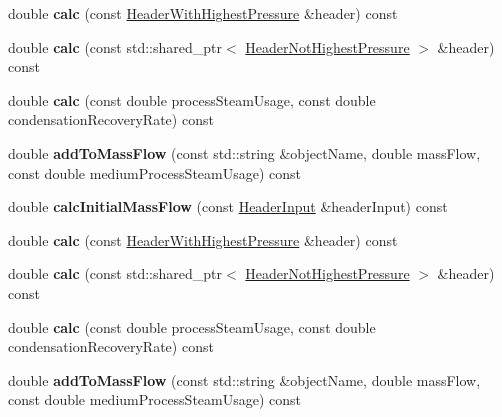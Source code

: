 \begin{DoxyCompactItemize}
\mbox{\label{class_mass_flow_calculator_a7213009c1ffc498b7dbac1d429cd6a93}} 
double {\bfseries calc} (const \hyperlink{class_header_with_highest_pressure}{Header\+With\+Highest\+Pressure} \&header) const
\item 
\mbox{\label{class_mass_flow_calculator_a2a3012c8c1d2ed53cdb38cd4a20b622d}} 
double {\bfseries calc} (const std\+::shared\+\_\+ptr$<$ \hyperlink{class_header_not_highest_pressure}{Header\+Not\+Highest\+Pressure} $>$ \&header) const
\item 
\mbox{\label{class_mass_flow_calculator_a5130b0192b5f041d1abe2f6094196849}} 
double {\bfseries calc} (const double process\+Steam\+Usage, const double condensation\+Recovery\+Rate) const
\item 
\mbox{\label{class_mass_flow_calculator_a53d5e454ecd9c62bbe2c201528797ec4}} 
double {\bfseries add\+To\+Mass\+Flow} (const std\+::string \&object\+Name, double mass\+Flow, const double medium\+Process\+Steam\+Usage) const
\item 
\mbox{\label{class_mass_flow_calculator_adb4bbfd8c503a653bf1950d5697574a4}} 
double {\bfseries calc\+Initial\+Mass\+Flow} (const \hyperlink{class_header_input}{Header\+Input} \&header\+Input) const
\item 
\mbox{\label{class_mass_flow_calculator_a7213009c1ffc498b7dbac1d429cd6a93}} 
double {\bfseries calc} (const \hyperlink{class_header_with_highest_pressure}{Header\+With\+Highest\+Pressure} \&header) const
\item 
\mbox{\label{class_mass_flow_calculator_a2a3012c8c1d2ed53cdb38cd4a20b622d}} 
double {\bfseries calc} (const std\+::shared\+\_\+ptr$<$ \hyperlink{class_header_not_highest_pressure}{Header\+Not\+Highest\+Pressure} $>$ \&header) const
\item 
\mbox{\label{class_mass_flow_calculator_a5130b0192b5f041d1abe2f6094196849}} 
double {\bfseries calc} (const double process\+Steam\+Usage, const double condensation\+Recovery\+Rate) const
\item 
\mbox{\label{class_mass_flow_calculator_a53d5e454ecd9c62bbe2c201528797ec4}} 
double {\bfseries add\+To\+Mass\+Flow} (const std\+::string \&object\+Name, double mass\+Flow, const double medium\+Process\+Steam\+Usage) const
\end{DoxyCompactItemize}


